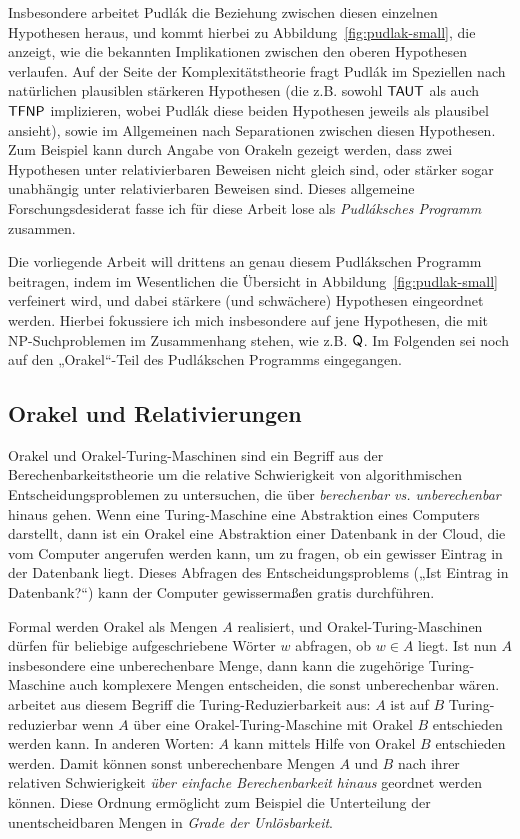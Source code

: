 Insbesondere arbeitet Pudlák die Beziehung zwischen diesen einzelnen Hypothesen heraus, und kommt hierbei zu Abbildung~\ref{fig:pudlak-small}, die anzeigt, wie die bekannten Implikationen zwischen den oberen Hypothesen verlaufen.
Auf der Seite der Komplexitätstheorie fragt Pudlák im Speziellen nach natürlichen plausiblen stärkeren Hypothesen (die z.B. sowohl $\mathsf{TAUT}$ als auch $\mathsf{TFNP}$ implizieren, wobei Pudlák diese beiden Hypothesen jeweils als plausibel ansieht), sowie im Allgemeinen nach Separationen zwischen diesen Hypothesen. Zum Beispiel kann durch Angabe von Orakeln gezeigt werden, dass zwei Hypothesen unter relativierbaren Beweisen nicht gleich sind, oder stärker sogar unabhängig unter relativierbaren Beweisen sind. 
Dieses allgemeine Forschungsdesiderat fasse ich für diese Arbeit lose als \emph{Pudláksches Programm} zusammen.

Die vorliegende Arbeit will drittens an genau diesem Pudlákschen Programm beitragen, indem im Wesentlichen die Übersicht in Abbildung~\ref{fig:pudlak-small} verfeinert wird, und dabei stärkere (und schwächere) Hypothesen eingeordnet werden. Hierbei fokussiere ich mich insbesondere auf jene Hypothesen, die mit NP-Suchproblemen im Zusammenhang stehen, wie z.B. $\mathsf{Q}$.
Im Folgenden sei noch auf den „Orakel“-Teil des Pudlákschen Programms eingegangen.


\subsection*{Orakel und Relativierungen}

Orakel und Orakel-Turing-Maschinen sind ein Begriff aus der Berechenbarkeitstheorie um die relative Schwierigkeit von algorithmischen Entscheidungsproblemen zu untersuchen, die über \emph{berechenbar vs. unberechenbar} hinaus gehen. Wenn eine Turing-Maschine eine Abstraktion eines Computers darstellt, dann ist ein Orakel eine Abstraktion einer Datenbank in der Cloud, die vom Computer angerufen werden kann, um zu fragen, ob ein gewisser Eintrag in der Datenbank liegt. Dieses Abfragen des Entscheidungsproblems („Ist Eintrag in Datenbank?“) kann der Computer gewissermaßen gratis durchführen.

Formal werden Orakel als Mengen $A$ realisiert, und Orakel-Turing-Maschinen dürfen für beliebige aufgeschriebene Wörter $w$ abfragen, ob $w\in A$ liegt. Ist nun $A$ insbesondere eine unberechenbare Menge, dann kann die zugehörige Turing-Maschine auch komplexere Mengen entscheiden, die sonst unberechenbar wären.
\textcite{post_recursively_1944} arbeitet aus diesem Begriff die Turing-Reduzierbarkeit aus: $A$ ist auf $B$ Turing-reduzierbar wenn $A$ über eine Orakel-Turing-Maschine mit Orakel $B$ entschieden werden kann. In anderen Worten: $A$ kann mittels Hilfe von Orakel $B$ entschieden werden.  Damit können sonst unberechenbare Mengen $A$ und $B$ nach ihrer relativen Schwierigkeit \emph{über einfache Berechenbarkeit hinaus} geordnet werden können. Diese Ordnung ermöglicht zum Beispiel die Unterteilung der unentscheidbaren Mengen in \emph{Grade der Unlösbarkeit}.

